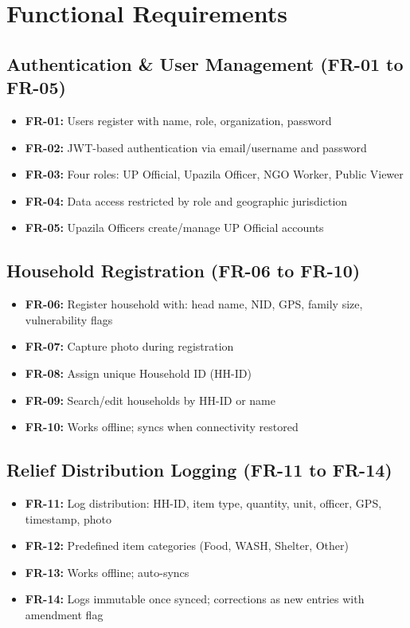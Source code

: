 
\section{Functional Requirements}

\subsection{Authentication \& User Management (FR-01 to FR-05)}
\begin{itemize}[nosep]
    \item \textbf{FR-01:} Users register with name, role, organization, password
    \item \textbf{FR-02:} JWT-based authentication via email/username and password
    \item \textbf{FR-03:} Four roles: UP Official, Upazila Officer, NGO Worker, Public Viewer
    \item \textbf{FR-04:} Data access restricted by role and geographic jurisdiction
    \item \textbf{FR-05:} Upazila Officers create/manage UP Official accounts
\end{itemize}

\subsection{Household Registration (FR-06 to FR-10)}
\begin{itemize}[nosep]
    \item \textbf{FR-06:} Register household with: head name, NID, GPS, family size, vulnerability flags
    \item \textbf{FR-07:} Capture photo during registration
    \item \textbf{FR-08:} Assign unique Household ID (HH-ID)
    \item \textbf{FR-09:} Search/edit households by HH-ID or name
    \item \textbf{FR-10:} Works offline; syncs when connectivity restored
\end{itemize}

\subsection{Relief Distribution Logging (FR-11 to FR-14)}
\begin{itemize}[nosep]
    \item \textbf{FR-11:} Log distribution: HH-ID, item type, quantity, unit, officer, GPS, timestamp, photo
    \item \textbf{FR-12:} Predefined item categories (Food, WASH, Shelter, Other)
    \item \textbf{FR-13:} Works offline; auto-syncs
    \item \textbf{FR-14:} Logs immutable once synced; corrections as new entries with amendment flag
\end{itemize}

